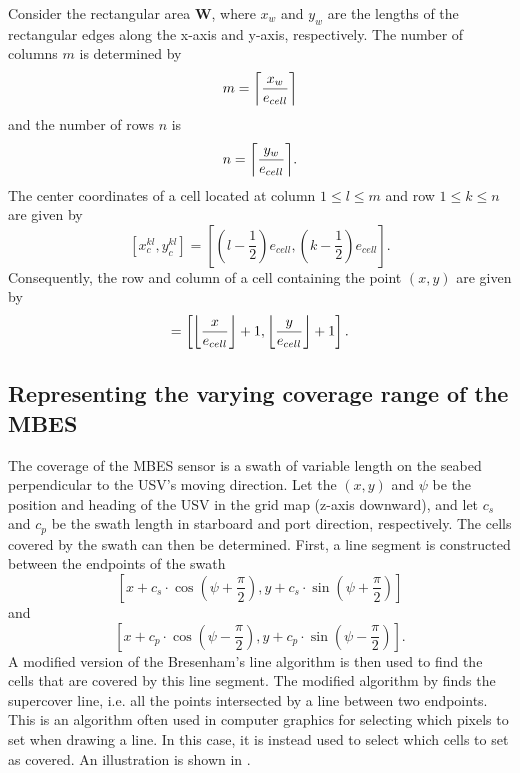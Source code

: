 Consider the rectangular area $\bm{W}$, where $x_w$ and $y_w$ are the lengths of the rectangular edges along the x-axis and y-axis, respectively. The number of columns $m$ is determined by
\begin{equation}
m = \ceil*{\frac{x_w}{e_{cell}}}
\end{equation}
and the number of rows $n$ is
\begin{equation}
n = \ceil*{\frac{y_w}{e_{cell}}}.
\end{equation}
The center coordinates of a cell located at column $1 \leq l \leq m$ and row $1 \leq k \leq n$ are given by
\begin{equation}
\left[x_c^{kl},y_c^{kl}\right] = \left[\left(l - \frac{1}{2}\right) e_{cell}, \left(k - \frac{1}{2}\right) e_{cell}\right].
\end{equation}
Consequently, the row and column of a cell containing the point $(x,y)$ are given by
\begin{equation}
[l,k] = \left[\floor*{\frac{x}{e_{cell}}} + 1, \floor*{\frac{y}{e_{cell}}} + 1 \right].
\end{equation}

\subsection{Representing the varying coverage range of the MBES} \label{sec:handle-mbes}

The coverage of the MBES sensor is a swath of variable length on the seabed perpendicular to the USV's moving direction. Let the $(x,y)$ and $\psi$ be the position and heading of the USV in the grid map (z-axis downward), and let $c_{s}$ and $c_{p}$ be the swath length in starboard and port direction, respectively. The cells covered by the swath can then be determined. First, a line segment is constructed between the endpoints of the swath
\begin{equation}
\left[ x + c_{s} \cdot \cos(\psi + \frac{\pi}{2}), y + c_{s} \cdot \sin(\psi + \frac{\pi}{2}) \right]
\end{equation}
and
\begin{equation}
\left[ x + c_{p} \cdot \cos(\psi - \frac{\pi}{2}), y + c_{p} \cdot \sin(\psi - \frac{\pi}{2}) \right].
\end{equation}
A modified version of the Bresenham's line algorithm \citep{wiki:bresenham} is then used to find the cells that are covered by this line segment. The modified algorithm by \citet{supercoverAlgo} finds the supercover line, i.e. all the points intersected by a line between two endpoints. This is an algorithm often used in computer graphics for selecting which pixels to set when drawing a line. In this case, it is instead used to select which cells to set as covered. An illustration is shown in .

